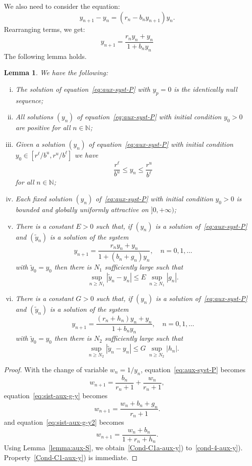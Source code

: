 \documentclass[reqno]{amsart}
\newtheorem{lemma}{Lemma}
\renewcommand{\le}{\leqslant}
\renewcommand{\ge}{\geqslant}
\newcommand{\N}{\ensuremath{\mathds N}}
\begin{document}
{{We also need to consider the equation:
\[
y_{n+1}-y_n=(r_n-b_ny_{n+1})y_n.
\]
Rearranging terms, we get:
\begin{equation}\label{eq:aux-syst-P}
y_{n+1}=\frac{r_ny_n+y_n}{1+b_ny_n}
\end{equation}
The following lemma holds.
\begin{lemma}\label{lemma:aux-P}
We have the following:
\begin{enumerate}[i)]
\item \label{Cond-C1-aux-y}
The solution of equation~\eqref{eq:aux-syst-P} with $y_p=0$ is the identically null sequence;
\item \label{Cond-C1a-aux-y}
All solutions $(y_n)$ of equation~\eqref{eq:aux-syst-P} with initial condition $y_0 > 0$ are positive for all $n \in \N$;
\item \label{Cond-C1b-aux-y}
Given a solution $(y_n)$ of equation~\eqref{eq:aux-syst-P} with initial condition $y_0 \in [r^\ell/b^u,r^u/b^\ell]$ we have
    $$\frac{r^\ell}{b^u} \le y_n \le \dfrac{r^u}{b^\ell}$$ for all $n \in \N$;
\item \label{Cond-C3-aux-y} Each fixed solution $(y_n)$ of~\eqref{eq:aux-syst-P} with initial condition $y_0 > 0$ is bounded and globally uniformly attractive on $]0,+\infty)$;
\item \label{cond-3-aux-y} There is a constant $E>0$ such that, if $(y_n)$ is a solution of~\eqref{eq:aux-syst-P} and $(\tilde y_n)$ is a solution of the system
\begin{equation}\label{eq:sist-aux-g-y}
y_{n+1}=\frac{r_ny_n+y_n}{1+(b_n+g_n)y_n}, \quad n=0,1,\ldots
\end{equation}
with $\tilde y_0=y_0$ then there is $N_1$ sufficiently large such that
\[
\sup_{n \ge N_1} |\tilde y_n - y_n| \le E \ \sup_{n \ge N_1} |g_n|.
\]
\item \label{cond-4-aux-y} There is a constant $G>0$ such that, if $(y_n)$ is a solution of~\eqref{eq:aux-syst-P} and $(\tilde y_n)$ is a solution of the system
\begin{equation}\label{eq:sist-aux-g-y2}
y_{n+1}=\frac{(r_n+h_n)y_n+y_n}{1+b_ny_n}, \quad n=0,1,\ldots
\end{equation}
with $\tilde y_0=y_0$ then there is $N_2$ sufficiently large such that
\[
\sup_{n \ge N_2} |\tilde y_n - y_n| \le G \ \sup_{n \ge N_2} |h_n|.
\]
\end{enumerate}
\end{lemma}

\begin{proof}
With the change of variable $w_n=1/y_n$, equation~\eqref{eq:aux-syst-P} becomes
\[
w_{n+1}=\frac{b_n}{r_n+1}+\frac{w_n}{r_n+1},
\]
equation~\eqref{eq:sist-aux-g-y} becomes
$$w_{n+1}=\frac{w_n+b_n+ g_n}{r_n+1}.$$
and equation~\eqref{eq:sist-aux-g-y2} becomes
$$w_{n+1}=\frac{w_n+b_n}{1+r_n+h_n}.$$
Using Lemma~\ref{lemma:aux-S}, we obtain~\ref{Cond-C1a-aux-y}) to~\ref{cond-4-aux-y}). Property~\ref{Cond-C1-aux-y}) is immediate.
\end{proof}

}}
\end{document}
